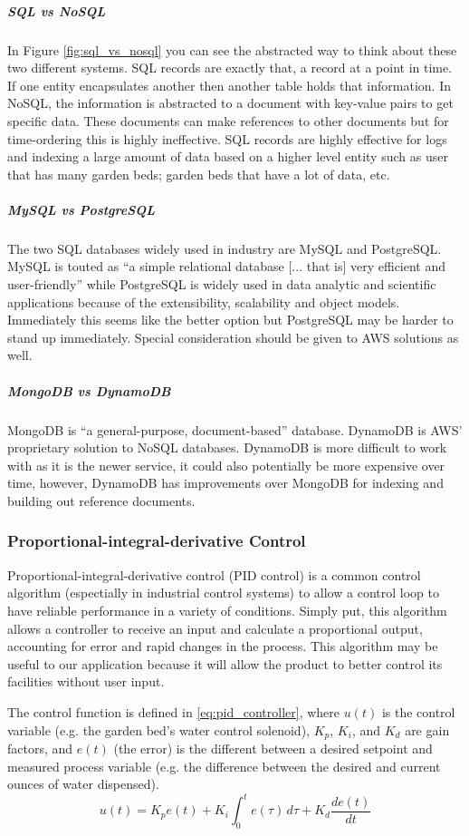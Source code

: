 \subparagraph{SQL vs NoSQL}
In Figure \ref{fig:sql_vs_nosql} you can see the abstracted way to think about these two different systems. SQL records are exactly that, a record at a point in time. If one entity encapsulates another then another table holds that information. In NoSQL, the information is abstracted to a document with key-value pairs to get specific data. These documents can make references to other documents but for time-ordering this is highly ineffective. SQL records are highly effective for logs and indexing a large amount of data based on a higher level entity such as user that has many garden beds; garden beds that have a lot of data, etc.

\subparagraph{MySQL vs PostgreSQL}
The two SQL databases widely used in industry are MySQL and PostgreSQL. MySQL is touted as ``a simple relational database [... that is] very efficient and user-friendly'' while PostgreSQL is widely used in data analytic and scientific applications because of the extensibility, scalability and object models. Immediately this seems like the better option but PostgreSQL may be harder to stand up immediately. Special consideration should be given to AWS solutions as well. 

\subparagraph{MongoDB vs DynamoDB}
MongoDB is ``a general-purpose, document-based'' database. DynamoDB is AWS' proprietary solution to NoSQL databases. DynamoDB is more difficult to work with as it is the newer service, it could also potentially be more expensive over time, however, DynamoDB has improvements over MongoDB for indexing and building out reference documents. 

\subsubsection{Proportional-integral-derivative Control}
Proportional-integral-derivative control (PID control) is a common control algorithm (espectially in industrial control systems) to allow a control loop to have reliable performance in a variety of conditions. Simply put, this algorithm allows a controller to receive an input and calculate a proportional output, accounting for error and rapid changes in the process. This algorithm may be useful to our application because it will allow the product to better control its facilities without user input.

The control function is defined in \autoref{eq:pid_controller}, where $u(t)$ is the control variable (e.g. the garden bed's water control solenoid), $K_p$, $K_i$, and $K_d$ are gain factors, and $e(t)$ (the error) is the different between a desired setpoint and measured process variable (e.g. the difference between the desired and current ounces of water dispensed).
\begin{equation}
    \label{eq:pid_controller}
    u(t) = K_pe(t) + K_i\int_{0}^{t}e(\tau) \, d\tau + K_d\frac{de(t)}{dt}
\end{equation}

